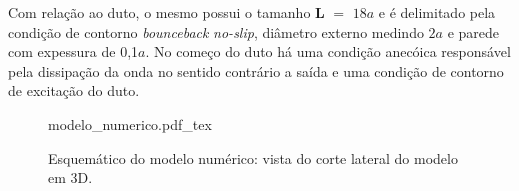 Com relação ao duto, o mesmo possui o tamanho \textbf{L} $=$ $18a$ e é delimitado pela condição de contorno \textit{bounceback} \textit{no-slip}, diâmetro externo medindo $2a$ e parede com expessura de 0,1$a$. No começo do duto há uma condição anecóica responsável pela dissipação da onda no sentido contrário a saída e uma condição de contorno de excitação do duto.    

\begin{figure}[ht!]
  \centering
  \def\svgwidth{400pt}
  {modelo_numerico.pdf_tex}
  \caption[Esquemático do modelo numérico]{Esquemático do modelo numérico: vista do corte lateral do modelo em 3D.}
  \label{fig:modelo}
\end{figure}